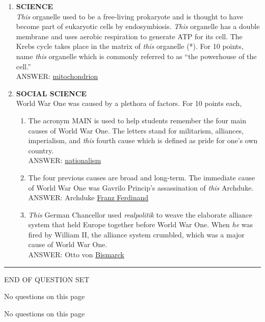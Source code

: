 \documentclass{report}
\newcommand*{\backtrack}{\setcounter{enumi}{\numexpr\theenumi-1\relax}}
\begin{document}
\begin{enumerate}
    \item \textbf{SCIENCE} \\ \textit{This} organelle used to be a free-living prokaryote and is thought to have become part of eukaryotic cells by endosymbiosis. \textit{This} organelle has a double membrane and uses aerobic respiration to generate ATP for its cell. The Krebs cycle takes place in the matrix of \textit{this} organelle (*). For 10 points, name \textit{this} organelle which is commonly referred to as ``the powerhouse of the cell.'' \\ ANSWER: \underline{mitochondrion} \backtrack
    \item \textbf{SOCIAL SCIENCE} \\ World War One was caused by a plethora of factors. For 10 points each,
    \begin{enumerate}[label=\Alph*]
        \item The acronym MAIN is used to help students remember the four main causes of World War One. The letters stand for militarism, alliances, imperialism, and \textit{this} fourth cause which is defined as pride for one's own country. \\ ANSWER: \underline{nationalism}
        \item The four previous causes are broad and long-term. The immediate cause of World War One was Gavrilo Princip's assassination of \textit{this} Archduke. \\ ANSWER: Archduke \underline{Franz Ferdinand}
        \item \textit{This} German Chancellor used \textit{realpolitik} to weave the elaborate alliance system that held Europe together before World War One. When \textit{he} was fired by William II, the alliance system crumbled, which was a major cause of World War One. \\ ANSWER: Otto von \underline{Bismarck}
    \end{enumerate}
\end{enumerate}

\vspace*{0.5 cm}
\centering
\rule{10 cm}{0.4pt}

\Large
END OF QUESTION SET
\newpage

\vspace*{\fill}
\centering
\thispagestyle{empty}
\Large
No questions on this page
\vspace*{\fill}

\newpage

\vspace*{\fill}
\centering
\thispagestyle{empty}
\Large
No questions on this page
\vspace*{\fill}
\end{document}
